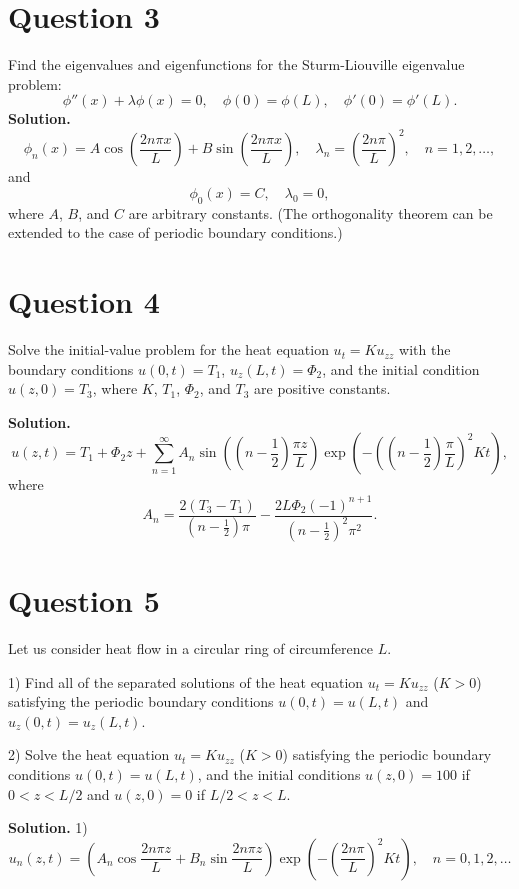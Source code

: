 \documentclass[lang=en,11pt]{template}
\begin{document}
 

\section*{Question 3}
Find the eigenvalues and eigenfunctions for the Sturm-Liouville eigenvalue problem:
\[
\phi''(x) + \lambda \phi(x) = 0, \quad \phi(0) = \phi(L), \quad \phi'(0) = \phi'(L).
\]
\textbf{Solution.} 
\[
\phi_n(x) = A \cos\left( \frac{2n\pi x}{L} \right) + B \sin\left( \frac{2n\pi x}{L} \right), \quad \lambda_n = \left( \frac{2n\pi}{L} \right)^2, \quad n = 1, 2, \ldots,
\]
and
\[
\phi_0(x) = C, \quad \lambda_0 = 0,
\]
where $A$, $B$, and $C$ are arbitrary constants. (The orthogonality theorem can be extended to the case of periodic boundary conditions.)

\section*{Question 4}
Solve the initial-value problem for the heat equation $u_t = K u_{zz}$ with the boundary conditions $u(0,t) = T_1$, $u_z(L,t) = \Phi_2$, and the initial condition $u(z,0) = T_3$, where $K$, $T_1$, $\Phi_2$, and $T_3$ are positive constants.

\textbf{Solution.} 
\[
u(z,t) = T_1 + \Phi_2 z + \sum_{n=1}^{\infty} A_n \sin\left( \left( n - \frac{1}{2} \right) \frac{\pi z}{L} \right) \exp\left( -\left( \left( n - \frac{1}{2} \right) \frac{\pi}{L} \right)^2 K t \right),
\]
where
\[
A_n = \frac{2(T_3 - T_1)}{\left( n - \frac{1}{2} \right)\pi} - \frac{2L \Phi_2 (-1)^{n+1}}{\left( n - \frac{1}{2} \right)^2 \pi^2}.
\]

\section*{Question 5}
Let us consider heat flow in a circular ring of circumference $L$.

1) Find all of the separated solutions of the heat equation $u_t = K u_{zz}$ ($K > 0$) satisfying the periodic boundary conditions $u(0,t) = u(L,t)$ and $u_z(0,t) = u_z(L,t)$.

2) Solve the heat equation $u_t = K u_{zz}$ ($K > 0$) satisfying the periodic boundary conditions $u(0,t) = u(L,t)$, and the initial conditions $u(z,0) = 100$ if $0 < z < L/2$ and $u(z,0) = 0$ if $L/2 < z < L$.

\textbf{Solution.}
1) 
\[
u_n(z,t) = \left( A_n \cos \frac{2n\pi z}{L} + B_n \sin \frac{2n\pi z}{L} \right) \exp\left( -\left( \frac{2n\pi}{L} \right)^2 K t \right), \quad n = 0, 1, 2, \ldots
\]
\end{document}
